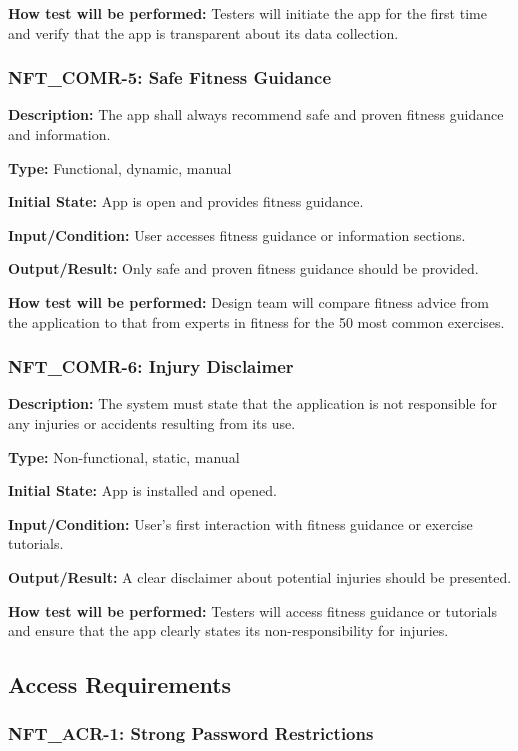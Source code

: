\documentclass[12pt, titlepage]{article}
\begin{document}
\textbf{How test will be performed: }Testers will initiate the app for the first time and verify that the app is transparent about its data collection.


\subsubsection*{\textbf{NFT\_COMR-5: Safe Fitness Guidance}
}

\textbf{Description: }The app shall always recommend safe and proven fitness guidance and information.

\textbf{Type:} Functional, dynamic, manual

\textbf{Initial State: }App is open and provides fitness guidance.

\textbf{Input/Condition:} User accesses fitness guidance or information sections.

\textbf{Output/Result: }Only safe and proven fitness guidance should be provided.

\textbf{How test will be performed:} Design team will compare fitness advice from the application to that from experts in fitness for the 50 most common exercises. 


\subsubsection*{\textbf{NFT\_COMR-6: Injury Disclaimer}
}

\textbf{Description: }The system must state that the application is not responsible for any injuries or accidents resulting from its use.

\textbf{Type: }Non-functional, static, manual

\textbf{Initial State: }App is installed and opened.

\textbf{Input/Condition:} User's first interaction with fitness guidance or exercise tutorials.

\textbf{Output/Result:} A clear disclaimer about potential injuries should be presented.

\textbf{How test will be performed:} Testers will access fitness guidance or tutorials and ensure that the app clearly states its non-responsibility for injuries.
\newline
\subsection{Access Requirements}


\subsubsection*{\textbf{NFT\_ACR-1: Strong Password Restrictions}
}
\end{document}
